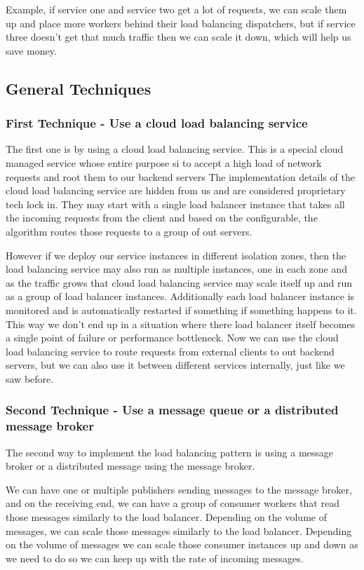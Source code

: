 Example, if service one and service two get a lot of requests, we can scale them up and place more workers behind their load balancing dispatchers, but if service three doesn't get that much traffic then we can scale it down, which will help us save money.

\subsection{General Techniques}

\subsubsection{First Technique - Use a cloud load balancing service}
The first one is by using a cloud load balancing service.
This is a special cloud managed service whose entire purpose si to accept a high load of network requests and root them to our backend servers
The implementation details of the cloud load balancing service are hidden from us and are considered proprietary tech lock in.
They may start with a single load balancer instance that takes all the incoming requests from the client and based on the configurable, the algorithm routes those requests to a group of out servers.

However if we deploy our service instances in different isolation zones, then the load balancing service may also run as multiple instances, one in each zone and as the traffic grows that cloud load balancing service may scale itself up and run as a group of load balancer instances.
Additionally each load balancer instance is monitored and is automatically restarted if something if something happens to it.
This way we don't end up in a situation where there load balancer itself becomes a single point of failure or performance bottleneck.
Now we can use the cloud load balancing service to route requests from external clients to out backend servers, but we can also use it between different services internally, just like we saw before.

\subsubsection{Second Technique - Use a message queue or a distributed message broker}
The second way to implement the load balancing pattern is using a message broker or a distributed message using the message broker.

We can have one or multiple publishers sending messages to the message broker, and on the receiving end, we can have a group of consumer workers that read those messages similarly to the load balancer.
Depending on the volume of messages, we can scale those messages similarly to the load balancer.
Depending on the volume of messages we can scale those consumer instances up and down as we need to do so we can keep up with the rate of incoming messages.


